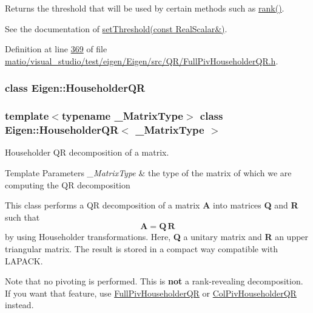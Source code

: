 Returns the threshold that will be used by certain methods such as \hyperlink{group___q_r___module_aeae555220f46477818ccc94aca2de770}{rank()}.

See the documentation of \hyperlink{group___q_r___module_a92277e572bf98245891015d12dd2b602}{set\+Threshold(const Real\+Scalar\&)}. 

Definition at line \hyperlink{matio_2visual__studio_2test_2eigen_2_eigen_2src_2_q_r_2_full_piv_householder_q_r_8h_source_l00369}{369} of file \hyperlink{matio_2visual__studio_2test_2eigen_2_eigen_2src_2_q_r_2_full_piv_householder_q_r_8h_source}{matio/visual\+\_\+studio/test/eigen/\+Eigen/src/\+Q\+R/\+Full\+Piv\+Householder\+Q\+R.\+h}.

\label{class_eigen_1_1_householder_q_r}
\subsubsection{class Eigen\+:\+:Householder\+QR}
\subsubsection*{template$<$typename \+\_\+\+Matrix\+Type$>$\newline
class Eigen\+::\+Householder\+Q\+R$<$ \+\_\+\+Matrix\+Type $>$}

Householder QR decomposition of a matrix. 


\begin{DoxyTemplParams}{Template Parameters}
{\em \+\_\+\+Matrix\+Type} & the type of the matrix of which we are computing the QR decomposition\\
\hline
\end{DoxyTemplParams}
This class performs a QR decomposition of a matrix {\bfseries A} into matrices {\bfseries Q} and {\bfseries R} such that \[ \mathbf{A} = \mathbf{Q} \, \mathbf{R} \] by using Householder transformations. Here, {\bfseries Q} a unitary matrix and {\bfseries R} an upper triangular matrix. The result is stored in a compact way compatible with L\+A\+P\+A\+CK.

Note that no pivoting is performed. This is {\bfseries not} a rank-\/revealing decomposition. If you want that feature, use \hyperlink{group___q_r___module_class_eigen_1_1_full_piv_householder_q_r}{Full\+Piv\+Householder\+QR} or \hyperlink{group___q_r___module_class_eigen_1_1_col_piv_householder_q_r}{Col\+Piv\+Householder\+QR} instead.


